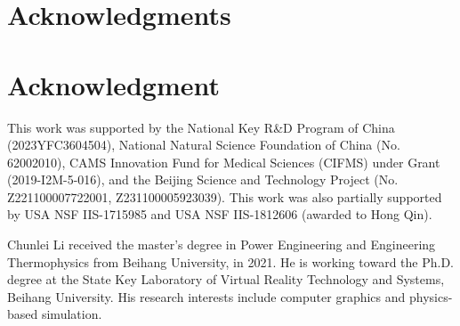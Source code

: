\documentclass[10pt,journal,compsoc]{IEEEtran}
\begin{document}
\ifCLASSOPTIONcompsoc
  \section*{Acknowledgments}
\else
  \section*{Acknowledgment}
\fi

{This work was supported by the National Key R\&D Program of China (2023YFC3604504), National Natural Science Foundation of China (No. 62002010), CAMS Innovation Fund for Medical Sciences (CIFMS) under Grant (2019-I2M-5-016), and the Beijing Science and Technology Project (No. Z221100007722001, Z231100005923039). This work was also partially supported by USA NSF IIS-1715985 and USA NSF IIS-1812606 (awarded to Hong Qin).
}


\ifCLASSOPTIONcaptionsoff
	\newpage
\fi







%  
% 

\vspace{-10 mm}
\begin{IEEEbiography}{Chunlei Li} received the master's degree in Power Engineering and Engineering Thermophysics from Beihang University, in 2021. He is working toward the Ph.D. degree at the State Key Laboratory of Virtual Reality Technology and Systems, Beihang University. His research interests include computer graphics and physics-based simulation. 
\end{IEEEbiography}
\vspace{-10 mm}
\end{document}
